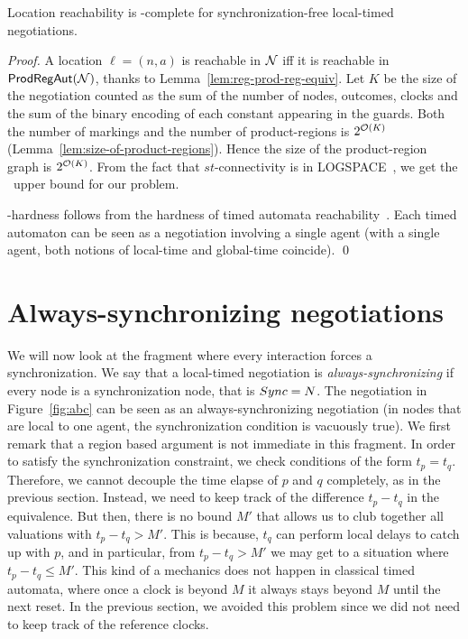 \begin{theorem}
  Location reachability is \PSPACE-complete for synchronization-free
  local-timed negotiations.
\end{theorem}
\begin{proof}
  A location $\ell = (n,a)$ is reachable in $\mathcal{N}$ iff it is reachable
  in $\mathsf{ProdRegAut}(\mathcal{N})$, thanks to Lemma~\ref{lem:reg-prod-reg-equiv}. Let
  $K$ be the size of the negotiation counted 
  as the sum of the number of nodes, outcomes, clocks and the sum of
  the binary encoding of each constant appearing in the guards. Both the number of markings and the number of
  product-regions is $2^{\mathcal{O}(K)}$
  (Lemma~\ref{lem:size-of-product-regions}). Hence the size of the
  product-region graph is $2^{\mathcal{O}(K)}$. From the fact that
  $st$-connectivity is in \textsf{LOGSPACE}~\cite{SAVITCH1970177}, we get the \PSPACE\
  upper bound for our problem. 



  \PSPACE-hardness follows from the hardness of timed automata
  reachability~\cite{DBLP:journals/tcs/AlurD94}. Each timed automaton can be seen as a negotiation involving
  a single agent 
  (with 
  a single agent, both notions of local-time and global-time
  coincide). \qed 
\end{proof}

\section{Always-synchronizing negotiations}
\label{sec:always-synchr-negot}

We will now look at the fragment where every interaction forces a
synchronization.  We say that a local-timed negotiation is
\emph{always-synchronizing} if every node is a synchronization node,
that is $Sync = N$. The negotiation in Figure~\ref{fig:abc} can be
seen as an always-synchronizing negotiation (in nodes that are local
to one agent, the synchronization condition is vacuously true). We
first remark that a region based argument is not immediate in this
fragment. In order to satisfy the synchronization constraint, we check
conditions of the form $t_p = t_q$. Therefore, we cannot decouple the
time elapse of $p$ and $q$ completely, as in the previous
section. Instead, we need to keep track of the difference $t_p - t_q$
in the equivalence. But then, there is no bound $M'$ that allows us to
club together all valuations with $t_p - t_q > M'$. This is because,
$t_q$ can perform local delays to catch up with $p$, and in
particular, from $t_p - t_q > M'$ we may get to a situation where
$t_p - t_q \le M'$. This kind of a mechanics does not happen in
classical timed automata, where once a clock is beyond $M$ it always
stays beyond $M$ until the next reset. In the previous section, we
avoided this problem since we did not need to keep track of the
reference clocks.


